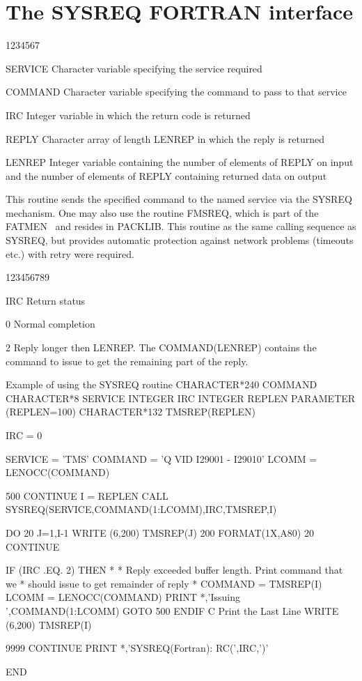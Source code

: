 \section{The SYSREQ FORTRAN interface}
\begin{DLtt}{1234567}
\item[SERVICE]Character variable specifying the service required
\item[COMMAND]Character variable specifying the command to pass to that service
\item[IRC]Integer variable in which the return code is returned
\item[REPLY]Character array of length LENREP in which the reply is returned
\item[LENREP]Integer variable containing the number of elements of REPLY
on input and the number of elements of REPLY containing returned data on
output
\end{DLtt}
\par
This routine sends the specified command to the named service via the
SYSREQ mechanism.
One may also use the routine FMSREQ, which is part of the FATMEN~\cite{bib-FATMEN}
and resides in PACKLIB. This routine as the same calling sequence as SYSREQ,
but provides automatic protection against network problems (timeouts etc.)
with retry were required.
\begin{DLtt}{123456789}
\item[IRC]Return status
\begin{DLtt}{12}
\item[0]Normal completion
\item[2]Reply longer then LENREP. The COMMAND(LENREP) contains the
command to issue to get the remaining part of the reply.
\end{DLtt}
\end{DLtt}
\begin{XMPt}{Example of using the SYSREQ routine}
      CHARACTER*240 COMMAND
      CHARACTER*8   SERVICE
      INTEGER       IRC
      INTEGER       REPLEN
      PARAMETER     (REPLEN=100)
      CHARACTER*132 TMSREP(REPLEN)

      IRC = 0

      SERVICE = 'TMS'
      COMMAND = 'Q VID I29001 - I29010'
      LCOMM   = LENOCC(COMMAND)

 500  CONTINUE
      I = REPLEN
      CALL SYSREQ(SERVICE,COMMAND(1:LCOMM),IRC,TMSREP,I)

      DO 20 J=1,I-1
      WRITE (6,200) TMSREP(J)
 200  FORMAT(1X,A80)
 20   CONTINUE

      IF (IRC .EQ. 2) THEN
*
*     Reply exceeded buffer length. Print command that we
*     should issue to get remainder of reply
*
         COMMAND = TMSREP(I)
         LCOMM   = LENOCC(COMMAND)
         PRINT *,'Issuing ',COMMAND(1:LCOMM)
         GOTO 500
      ENDIF
C       Print the Last Line
      WRITE (6,200) TMSREP(I)

 9999 CONTINUE
      PRINT *,'SYSREQ(Fortran): RC(',IRC,')'

      END

\end{XMPt}
